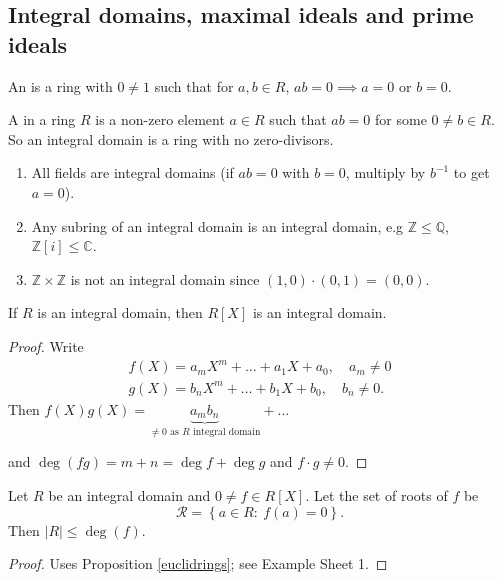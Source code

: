 \documentclass[egregdoesnotlikesansseriftitles,a4paper]{scrartcl}
\begin{document}
\subsection{Integral domains, maximal ideals and prime ideals}
\begin{definition*}
       An  is a ring with $0 \neq 1$ such that for $a,b \in R$, $ab=0 \implies a=0 \text{ or } b=0$.

       A  in a ring $R$ is a non-zero element $a \in R$ such that $ab=0$ for some $0 \neq b \in R$. So an integral domain is a ring with no zero-divisors.
\end{definition*}
\begin{example*}
       \begin{enumerate}
             \item All fields are integral domains (if $ab=0$ with $b=0$, multiply by $b^{-1}$ to get $a=0$).
             \item Any subring of an integral domain is an integral domain, e.g $\mathbb{Z} \leq  \mathbb{Q}$, $\mathbb{Z}[i] \leq \mathbb{C}$.
             \item $\mathbb{Z} \times \mathbb{Z}$ is not an integral domain since $\left(1,0\right)\cdot \left(0,1\right)=\left(0,0\right)$.
       \end{enumerate}
\end{example*}
\begin{lemma}
       If $R$ is an integral domain, then $R[X]$ is an integral domain.
       \begin{proof}
            Write
            \begin{align*}
                 f \left(X\right)=a_{m}X^{m}+\ldots+a_1 X+ a_0, \quad a_{m}\neq 0\\
                 g \left(X\right)=b_{n}X^{m}+\ldots+b_1 X+ b_0, \quad b_{n}\neq 0.
            \end{align*}
            Then $f \left(X\right)g \left(X\right)=\underbrace{a_{m}b_{n}}_{\neq 0 \text{ as } R \text{ integral domain} }+\ldots $ 
            
            and $\operatorname{deg}\left(fg\right)=m+n=\operatorname{deg}f+ \operatorname{deg}g$ and $f \cdot g \neq 0$.
     \end{proof}
\end{lemma}
\begin{lemma}
       Let $R$ be an integral domain and $0 \neq f \in R[X]$. Let the set of roots of $f$ be \[
       \mathcal{R}=\left\{a \in R: \ f (a)=0\right\}
       .\] Then $\left|R\right|\leq \operatorname{deg}(f)$.
       \begin{proof}
            Uses Proposition \ref{euclidrings}; see Example Sheet 1.
     \end{proof}
\end{lemma}
\end{document}
